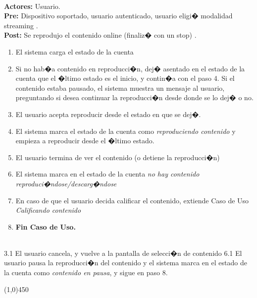 \documentclass[11pt, a4paper, spanish]{article}
\begin{document}
 \\
\textbf{Actores:} Usuario.  \\
\textbf{Pre:} Dispositivo soportado, usuario autenticado, usuario eligi� modalidad streaming . \\
\textbf{Post:} Se reprodujo el contenido online (finaliz� con un stop) .\\
\begin{enumerate}
	\item El sistema carga el estado de la cuenta
	\item Si no hab�a contenido en reproducci�n, dej� asentado en el estado de la cuenta que el �ltimo estado es el inicio, y contin�a con el paso 4. Si el contenido estaba pausado, el sistema muestra un mensaje al usuario, preguntando si desea continuar la reproducci�n desde donde se lo dej� o no.
	\item El usuario acepta reproducir desde el estado en que se dej�.
	\item El sistema marca el estado de la cuenta como \emph{reproduciendo contenido} y empieza a reproducir desde el �ltimo estado.
	\item El usuario termina de ver el contenido (o detiene la reproducci�n)
	\item El sistema marca en el estado de la cuenta \emph{no hay contenido reproduci�ndose/descarg�ndose}
	\item En caso de que el usuario decida calificar el contenido, extiende Caso de Uso \emph{Calificando contenido}
	\item \textbf{Fin Caso de Uso.}
\end{enumerate}
 \\

3.1 El usuario cancela, y vuelve a la pantalla de selecci�n de contenido
6.1 El usuario pausa la reproducci�n del contenido y el sistema marca en el estado de la cuenta como \emph{contenido en pausa}, y sigue en paso 8.

\begin{center} \line(1,0){450} \end{center}

\newpage
\end{document}
